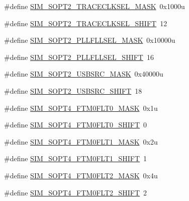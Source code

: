 \begin{DoxyCompactItemize}
\item 
\#define \hyperlink{group___s_i_m___register___masks_ga332894211abcda547cbf5d5093bd3f72}{S\+I\+M\+\_\+\+S\+O\+P\+T2\+\_\+\+T\+R\+A\+C\+E\+C\+L\+K\+S\+E\+L\+\_\+\+M\+A\+SK}~0x1000u
\item 
\#define \hyperlink{group___s_i_m___register___masks_ga6ce7d361b38ac28e6976c71569fe672b}{S\+I\+M\+\_\+\+S\+O\+P\+T2\+\_\+\+T\+R\+A\+C\+E\+C\+L\+K\+S\+E\+L\+\_\+\+S\+H\+I\+FT}~12
\item 
\#define \hyperlink{group___s_i_m___register___masks_gaa14141a225f9778babacbf3b90d0bae2}{S\+I\+M\+\_\+\+S\+O\+P\+T2\+\_\+\+P\+L\+L\+F\+L\+L\+S\+E\+L\+\_\+\+M\+A\+SK}~0x10000u
\item 
\#define \hyperlink{group___s_i_m___register___masks_gae98b4d574b65472bdb294092d4ce5b4a}{S\+I\+M\+\_\+\+S\+O\+P\+T2\+\_\+\+P\+L\+L\+F\+L\+L\+S\+E\+L\+\_\+\+S\+H\+I\+FT}~16
\item 
\#define \hyperlink{group___s_i_m___register___masks_ga1caf7ffe2555eb59ed410110b6aba463}{S\+I\+M\+\_\+\+S\+O\+P\+T2\+\_\+\+U\+S\+B\+S\+R\+C\+\_\+\+M\+A\+SK}~0x40000u
\item 
\#define \hyperlink{group___s_i_m___register___masks_ga2a455b7e86f26185c92961e139d13a89}{S\+I\+M\+\_\+\+S\+O\+P\+T2\+\_\+\+U\+S\+B\+S\+R\+C\+\_\+\+S\+H\+I\+FT}~18
\item 
\#define \hyperlink{group___s_i_m___register___masks_gaa868cd9e56dc4f0280f6d1866da1ac57}{S\+I\+M\+\_\+\+S\+O\+P\+T4\+\_\+\+F\+T\+M0\+F\+L\+T0\+\_\+\+M\+A\+SK}~0x1u
\item 
\#define \hyperlink{group___s_i_m___register___masks_gafc9e6a78afb92b0ff8189d6bc30c39ce}{S\+I\+M\+\_\+\+S\+O\+P\+T4\+\_\+\+F\+T\+M0\+F\+L\+T0\+\_\+\+S\+H\+I\+FT}~0
\item 
\#define \hyperlink{group___s_i_m___register___masks_gaa42586e5889050292d5e70bf2d1aea2d}{S\+I\+M\+\_\+\+S\+O\+P\+T4\+\_\+\+F\+T\+M0\+F\+L\+T1\+\_\+\+M\+A\+SK}~0x2u
\item 
\#define \hyperlink{group___s_i_m___register___masks_gaf503fb0314431593f41ebe5fa4b83851}{S\+I\+M\+\_\+\+S\+O\+P\+T4\+\_\+\+F\+T\+M0\+F\+L\+T1\+\_\+\+S\+H\+I\+FT}~1
\item 
\#define \hyperlink{group___s_i_m___register___masks_gafa0c4deac7488857fd22e28602b612fb}{S\+I\+M\+\_\+\+S\+O\+P\+T4\+\_\+\+F\+T\+M0\+F\+L\+T2\+\_\+\+M\+A\+SK}~0x4u
\item 
\#define \hyperlink{group___s_i_m___register___masks_gacca0c622cfa1e0c7e7214096c38c6557}{S\+I\+M\+\_\+\+S\+O\+P\+T4\+\_\+\+F\+T\+M0\+F\+L\+T2\+\_\+\+S\+H\+I\+FT}~2
\item 

\end{DoxyCompactItemize}
